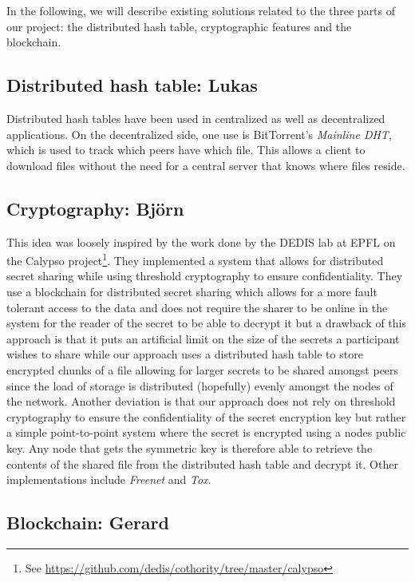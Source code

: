 \documentclass[12pt,a4paper,draft]{article}
\begin{document}
In the following, we will describe existing solutions related to the three parts of our project: the distributed hash table, cryptographic features and the blockchain.

\subsection{Distributed hash table: Lukas}

Distributed hash tables have been used in centralized as well as decentralized applications.
On the decentralized side, one use is BitTorrent's \emph{Mainline DHT}, which is used to track which peers have which file.
This allows a client to download files without the need for a central server that knows where files reside.

\subsection{Cryptography: Björn}



This idea was loosely inspired by the work done by the DEDIS lab at EPFL on the Calypso project\footnote{See \url{https://github.com/dedis/cothority/tree/master/calypso}}. They implemented a system that allows for distributed secret sharing while using threshold cryptography to ensure confidentiality. They use a blockchain for distributed secret sharing which allows for a more fault tolerant access to the data and does not require the sharer to be online in the system for the reader of the secret to be able to decrypt it but a drawback of this approach is that it puts an artificial limit on the size of the secrets a participant wishes to share while our approach uses a distributed hash table to store encrypted chunks of a file allowing for larger secrets to be shared amongst peers since the load of storage is distributed (hopefully) evenly amongst the nodes of the network. Another deviation is that our approach does not rely on threshold cryptography to ensure the confidentiality of the secret encryption key but rather a simple point-to-point system where the secret is encrypted using a nodes public key. Any node that gets the symmetric key is therefore able to retrieve the contents of the shared file from the distributed hash table and decrypt it.
Other implementations include \emph{Freenet} and \emph{Tox}.

\subsection{Blockchain: Gerard}
\end{document}

